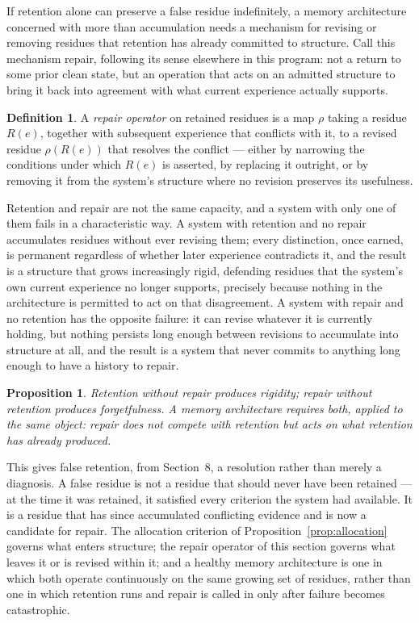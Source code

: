 \documentclass[11pt]{amsart}
\theoremstyle{plain}
\newtheorem{proposition}[theorem]{Proposition}
\theoremstyle{definition}
\newtheorem{definition}[theorem]{Definition}
\theoremstyle{remark}
\begin{document}
If retention alone can preserve a false residue indefinitely, a memory
architecture concerned with more than accumulation needs a mechanism
for revising or removing residues that retention has already
committed to structure. Call this mechanism repair, following its
sense elsewhere in this program: not a return to some prior clean
state, but an operation that acts on an admitted structure to bring it
back into agreement with what current experience actually supports.

\begin{definition}
A \emph{repair operator} on retained residues is a map $\rho$ taking a
residue $R(e)$, together with subsequent experience that conflicts with
it, to a revised residue $\rho(R(e))$ that resolves the conflict ---
either by narrowing the conditions under which $R(e)$ is asserted, by
replacing it outright, or by removing it from the system's structure
where no revision preserves its usefulness.
\end{definition}

Retention and repair are not the same capacity, and a system with only
one of them fails in a characteristic way. A system with retention and
no repair accumulates residues without ever revising them; every
distinction, once earned, is permanent regardless of whether later
experience contradicts it, and the result is a structure that grows
increasingly rigid, defending residues that the system's own current
experience no longer supports, precisely because nothing in the
architecture is permitted to act on that disagreement. A system with
repair and no retention has the opposite failure: it can revise
whatever it is currently holding, but nothing persists long enough
between revisions to accumulate into structure at all, and the result
is a system that never commits to anything long enough to have a
history to repair.

\begin{proposition}
\label{prop:retention-repair}
Retention without repair produces rigidity; repair without retention
produces forgetfulness. A memory architecture requires both, applied to
the same object: repair does not compete with retention but acts on
what retention has already produced.
\end{proposition}

This gives false retention, from Section~8, a resolution rather than
merely a diagnosis. A false residue is not a residue that should never
have been retained --- at the time it was retained, it satisfied every
criterion the system had available. It is a residue that has since
accumulated conflicting evidence and is now a candidate for repair. The
allocation criterion of Proposition~\ref{prop:allocation} governs what
enters structure; the repair operator of this section governs what
leaves it or is revised within it; and a healthy memory architecture is
one in which both operate continuously on the same growing set of
residues, rather than one in which retention runs and repair is called
in only after failure becomes catastrophic.
\end{document}
